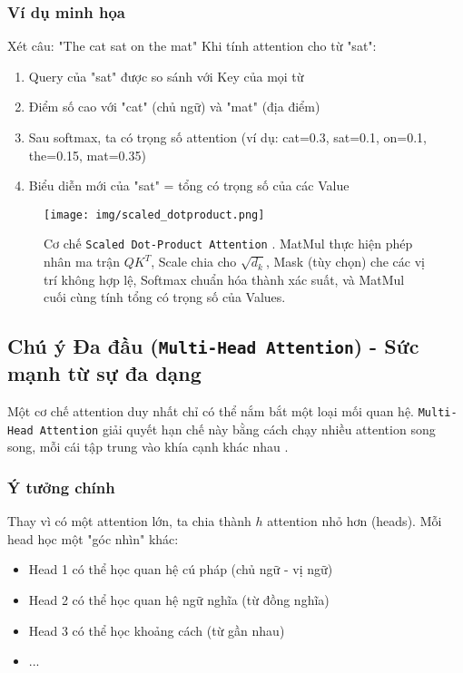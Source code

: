 \subsubsection{Ví dụ minh họa}
Xét câu: "The cat sat on the mat"
Khi tính attention cho từ "sat":
\begin{enumerate}
    \item Query của "sat" được so sánh
    với Key của mọi từ
    \item Điểm số cao với "cat" (chủ ngữ) và "mat" (địa điểm)
    \item Sau softmax, ta có trọng số attention (ví dụ: cat=0.3, sat=0.1, on=0.1, the=0.15, mat=0.35)
    \item Biểu diễn mới của "sat" = tổng có trọng số của các Value
\end{enumerate}

\begin{figure}[H]
    \centering
    \texttt{[image: img/scaled\_dotproduct.png]}
    \caption{Cơ chế \texttt{Scaled Dot-Product Attention} \cite{vaswani2017attention}.
    MatMul thực hiện phép nhân ma trận $QK^T$, Scale chia cho $\sqrt{d_k}$, Mask (tùy chọn) che các vị trí không hợp lệ, Softmax chuẩn hóa thành xác suất, và MatMul cuối cùng tính tổng có trọng số của Values.}
    \label{fig:scaled_dot_product_attention}
\end{figure}

\subsection{Chú ý Đa đầu (\texttt{Multi-Head Attention}) - Sức mạnh từ sự đa dạng}
\label{ssec:multi_head_attention}
Một cơ chế attention duy nhất chỉ có thể nắm bắt một loại mối quan hệ.
\texttt{Multi-Head Attention} giải quyết hạn chế này bằng cách chạy nhiều attention song song, mỗi cái tập trung vào khía cạnh khác nhau \cite{vaswani2017attention}.
\subsubsection{Ý tưởng chính}
Thay vì có một attention lớn, ta chia thành $h$ attention nhỏ hơn (heads).
Mỗi head học một "góc nhìn" khác:
\begin{itemize}
    \item Head 1 có thể học quan hệ cú pháp (chủ ngữ - vị ngữ)
    \item Head 2 có thể học quan hệ ngữ nghĩa (từ đồng nghĩa)
    \item Head 3 có thể học khoảng cách (từ gần nhau)
    \item ...
\end{itemize}


